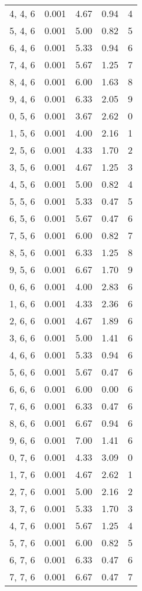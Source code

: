 \documentclass[12pt]{article}
\begin{document}
\begin{tabular}{c || c || c | c | c}
4, 4, 6 & 0.001 & 4.67 & 0.94 & 4 \\
5, 4, 6 & 0.001 & 5.00 & 0.82 & 5 \\
6, 4, 6 & 0.001 & 5.33 & 0.94 & 6 \\
7, 4, 6 & 0.001 & 5.67 & 1.25 & 7 \\
8, 4, 6 & 0.001 & 6.00 & 1.63 & 8 \\
9, 4, 6 & 0.001 & 6.33 & 2.05 & 9 \\
0, 5, 6 & 0.001 & 3.67 & 2.62 & 0 \\
1, 5, 6 & 0.001 & 4.00 & 2.16 & 1 \\
2, 5, 6 & 0.001 & 4.33 & 1.70 & 2 \\
3, 5, 6 & 0.001 & 4.67 & 1.25 & 3 \\
4, 5, 6 & 0.001 & 5.00 & 0.82 & 4 \\
5, 5, 6 & 0.001 & 5.33 & 0.47 & 5 \\
6, 5, 6 & 0.001 & 5.67 & 0.47 & 6 \\
7, 5, 6 & 0.001 & 6.00 & 0.82 & 7 \\
8, 5, 6 & 0.001 & 6.33 & 1.25 & 8 \\
9, 5, 6 & 0.001 & 6.67 & 1.70 & 9 \\
0, 6, 6 & 0.001 & 4.00 & 2.83 & 6 \\
1, 6, 6 & 0.001 & 4.33 & 2.36 & 6 \\
2, 6, 6 & 0.001 & 4.67 & 1.89 & 6 \\
3, 6, 6 & 0.001 & 5.00 & 1.41 & 6 \\
4, 6, 6 & 0.001 & 5.33 & 0.94 & 6 \\
5, 6, 6 & 0.001 & 5.67 & 0.47 & 6 \\
6, 6, 6 & 0.001 & 6.00 & 0.00 & 6 \\
7, 6, 6 & 0.001 & 6.33 & 0.47 & 6 \\
8, 6, 6 & 0.001 & 6.67 & 0.94 & 6 \\
9, 6, 6 & 0.001 & 7.00 & 1.41 & 6 \\
0, 7, 6 & 0.001 & 4.33 & 3.09 & 0 \\
1, 7, 6 & 0.001 & 4.67 & 2.62 & 1 \\
2, 7, 6 & 0.001 & 5.00 & 2.16 & 2 \\
3, 7, 6 & 0.001 & 5.33 & 1.70 & 3 \\
4, 7, 6 & 0.001 & 5.67 & 1.25 & 4 \\
5, 7, 6 & 0.001 & 6.00 & 0.82 & 5 \\
6, 7, 6 & 0.001 & 6.33 & 0.47 & 6 \\
7, 7, 6 & 0.001 & 6.67 & 0.47 & 7 \\

\end{tabular}
\end{document}
